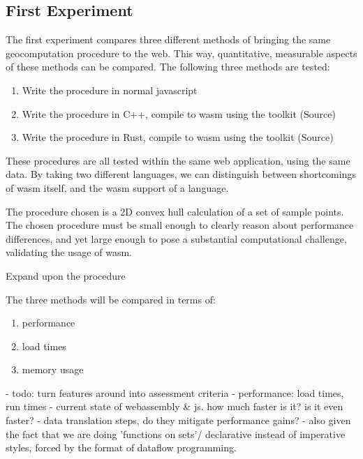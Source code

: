 
\subsection{First Experiment}
The first experiment compares three different methods of bringing the same geocomputation procedure to the web. 
This way, quantitative, measurable aspects of these methods can be compared. 
The following three methods are tested:
\begin{enumerate}[-]
  \item Write the procedure in normal javascript
  \item Write the procedure in C++, compile to wasm using the  toolkit (Source)
  \item Write the procedure in Rust, compile to wasm using the  toolkit (Source)
\end{enumerate}
These procedures are all tested within the same web application, using the same data. 
By taking two different languages, we can distinguish between shortcomings of \ac{wasm} itself, and the \ac{wasm} support of a language.  

The procedure chosen is a 2D convex hull calculation of a set of sample points. 
The chosen procedure must be small enough to clearly reason about performance differences, and yet large enough to pose a substantial computational challenge, validating the usage of \ac{wasm}.

\begin{note}
  Expand upon the procedure
\end{note}

The three methods will be compared in terms of:
\begin{enumerate}[-]
  \item performance
  \item load times
  \item memory usage
\end{enumerate}

\begin{note}
  - todo: turn features around into assessment criteria
  - performance: load times, run times
  - current state of webassembly & js. how much faster is it? is it even faster? 
     - data translation steps, do they mitigate performance gains? 
     - also given the fact that we are doing 'functions on sets'/ declarative instead of imperative styles, forced by the format of dataflow programming. 
\end{note}

